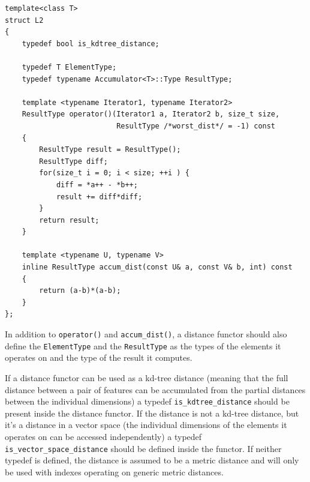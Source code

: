 \documentclass[letter,10pt]{article}
\begin{document}
\begin{Verbatim}[fontsize=\footnotesize,frame=single]
template<class T>
struct L2
{
    typedef bool is_kdtree_distance;

    typedef T ElementType;
    typedef typename Accumulator<T>::Type ResultType;

    template <typename Iterator1, typename Iterator2>
    ResultType operator()(Iterator1 a, Iterator2 b, size_t size, 
                          ResultType /*worst_dist*/ = -1) const
    {
        ResultType result = ResultType();
        ResultType diff;
        for(size_t i = 0; i < size; ++i ) {
            diff = *a++ - *b++;
            result += diff*diff;
        }
        return result;
    }

    template <typename U, typename V>
    inline ResultType accum_dist(const U& a, const V& b, int) const
    {
        return (a-b)*(a-b);
    }
};
\end{Verbatim}

In addition to \texttt{operator()} and \texttt{accum\_dist()}, a distance functor should also define the
\texttt{ElementType} and the \texttt{ResultType} as the types of the elements it operates on and the type of the result
it computes.

If a distance functor can be used as a kd-tree distance (meaning that the full distance between a pair of features can
be accumulated from the partial distances between the individual dimensions) a typedef \texttt{is\_kdtree\_distance}
should be present inside the distance functor. If the distance is not a kd-tree distance, but it's a distance in a
vector space (the individual dimensions of the elements it operates on can be accessed independently) a typedef
\texttt{is\_vector\_space\_distance} should be defined inside the functor. If neither typedef is defined, the distance
is assumed to be a metric distance and will only be used with indexes operating on generic metric distances.
\\
\end{document}
